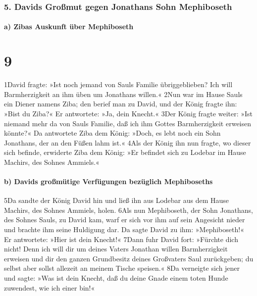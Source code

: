\hypertarget{davids-grouxdfmut-gegen-jonathans-sohn-mephiboseth}{%
\subsubsection{5. Davids Großmut gegen Jonathans Sohn
Mephiboseth}\label{davids-grouxdfmut-gegen-jonathans-sohn-mephiboseth}}

\hypertarget{a-zibas-auskunft-uxfcber-mephiboseth}{%
\paragraph{a) Zibas Auskunft über
Mephiboseth}\label{a-zibas-auskunft-uxfcber-mephiboseth}}

\hypertarget{section-8}{%
\section{9}\label{section-8}}

1David fragte: »Ist noch jemand von Sauls Familie übriggeblieben? Ich
will Barmherzigkeit an ihm üben um Jonathans willen.« 2Nun war im Hause
Sauls ein Diener namens Ziba; den berief man zu David, und der König
fragte ihn: »Bist du Ziba?« Er antwortete: »Ja, dein Knecht.« 3Der König
fragte weiter: »Ist niemand mehr da von Sauls Familie, daß ich ihm
Gottes Barmherzigkeit erweisen könnte?« Da antwortete Ziba dem König:
»Doch, es lebt noch ein Sohn Jonathans, der an den Füßen lahm ist.« 4Als
der König ihn nun fragte, wo dieser sich befinde, erwiderte Ziba dem
König: »Er befindet sich zu Lodebar im Hause Machirs, des Sohnes
Ammiels.«

\hypertarget{b-davids-grouxdfmuxfctige-verfuxfcgungen-bezuxfcglich-mephiboseths}{%
\paragraph{b) Davids großmütige Verfügungen bezüglich
Mephiboseths}\label{b-davids-grouxdfmuxfctige-verfuxfcgungen-bezuxfcglich-mephiboseths}}

5Da sandte der König David hin und ließ ihn aus Lodebar aus dem Hause
Machirs, des Sohnes Ammiels, holen. 6Als nun Mephiboseth, der Sohn
Jonathans, des Sohnes Sauls, zu David kam, warf er sich vor ihm auf sein
Angesicht nieder und brachte ihm seine Huldigung dar. Da sagte David zu
ihm: »Mephiboseth!« Er antwortete: »Hier ist dein Knecht!« 7Dann fuhr
David fort: »Fürchte dich nicht! Denn ich will dir um deines Vaters
Jonathan willen Barmherzigkeit erweisen und dir den ganzen Grundbesitz
deines Großvaters Saul zurückgeben; du selbst aber sollst allezeit an
meinem Tische speisen.« 8Da verneigte sich jener und sagte: »Was ist
dein Knecht, daß du deine Gnade einem toten Hunde zuwendest, wie ich
einer bin!«

